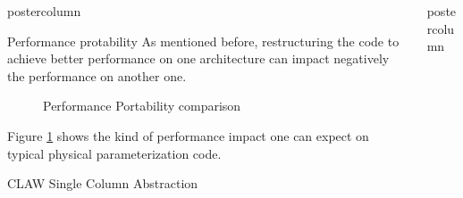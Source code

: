 \documentclass{beamer}
\newlength{\columnheight}
\begin{document}
\begin{frame}
\begin{columns}
\begin{column}{.43\textwidth}
\begin{beamercolorbox}[center]{postercolumn}
\begin{minipage}{.98\textwidth}
{%
%
\begin{myblock}{Performance protability}
As mentioned before, restructuring the code to achieve better performance on
one architecture can impact negatively the performance on another one.

\begin{figure}[ht]
\caption[Performance Portability comparison]{Performance Portability comparison}
\label{fig:perfportability}
\end{figure}

Figure \ref{fig:perfportability} shows the kind of performance impact one can
expect on typical physical parameterization code.

\end{myblock}\vfill

\begin{myblock}{CLAW Single Column Abstraction}
\end{myblock}\vfill

}\end{minipage}\end{beamercolorbox}
\end{column}

%
%
\begin{column}{.57\textwidth}
\begin{beamercolorbox}[center]{postercolumn}
\begin{minipage}{.98\textwidth} %
\parbox[t][\columnheight]{\textwidth}{ %

}
\end{minipage}
\end{beamercolorbox}
\end{column}
\end{columns}
\end{frame}
\end{document}
